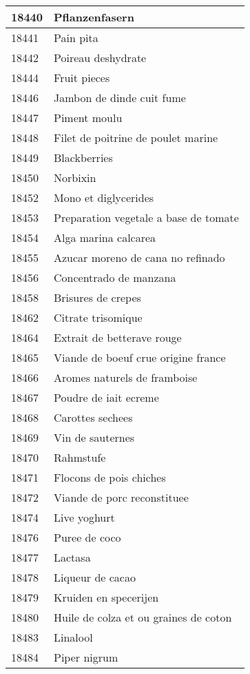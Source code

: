 \begin{longtable}{|l|l|}
18440 & Pflanzenfasern \\ \hline 
18441 & Pain pita \\ \hline 
18442 & Poireau deshydrate \\ \hline 
18444 & Fruit pieces \\ \hline 
18446 & Jambon de dinde cuit fume \\ \hline 
18447 & Piment moulu \\ \hline 
18448 & Filet de poitrine de poulet marine \\ \hline 
18449 & Blackberries \\ \hline 
18450 & Norbixin \\ \hline 
18452 & Mono et diglycerides \\ \hline 
18453 & Preparation vegetale a base de tomate \\ \hline 
18454 & Alga marina calcarea \\ \hline 
18455 & Azucar moreno de cana no refinado \\ \hline 
18456 & Concentrado de manzana \\ \hline 
18458 & Brisures de crepes \\ \hline 
18462 & Citrate trisomique \\ \hline 
18464 & Extrait de betterave rouge \\ \hline 
18465 & Viande de boeuf crue origine france \\ \hline 
18466 & Aromes naturels de framboise \\ \hline 
18467 & Poudre de iait ecreme \\ \hline 
18468 & Carottes sechees \\ \hline 
18469 & Vin de sauternes \\ \hline 
18470 & Rahmstufe \\ \hline 
18471 & Flocons de pois chiches \\ \hline 
18472 & Viande de porc reconstituee \\ \hline 
18474 & Live yoghurt \\ \hline 
18476 & Puree de coco \\ \hline 
18477 & Lactasa \\ \hline 
18478 & Liqueur de cacao \\ \hline 
18479 & Kruiden en specerijen \\ \hline 
18480 & Huile de colza et ou graines de coton \\ \hline 
18483 & Linalool \\ \hline 
18484 & Piper nigrum \\ \hline 

\end{longtable}
